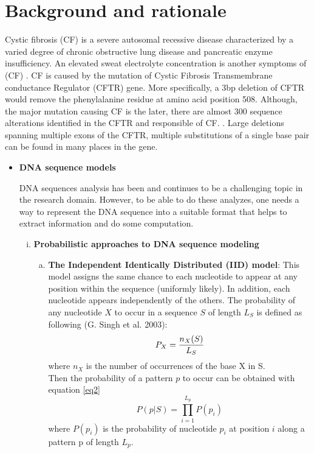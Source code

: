 \documentclass[10pt,twocolumn,letterpaper]{article}
\begin{document}
\section{Background and rationale}
 {
    \par Cystic fibrosis (CF) is a severe autosomal recessive disease characterized by a varied degree of chronic obstructive lung disease and pancreatic
    enzyme insufficiency. An elevated sweat electrolyte concentration is another symptoms of (CF) \cite{riordan1989identification}\cite{tsui1992spectrum}.
    CF is caused by the mutation of Cystic Fibrosis Transmembrane conductance Regulator (CFTR) gene. More specifically, a 3bp deletion of CFTR would remove 
    the phenylalanine residue at amino acid position 508. Although, the major mutation causing CF is the later, there are almost 300 sequence alterations 
    identified in the CFTR and responsible of CF. \cite{tsui1992spectrum}. Large deletions spanning multiple exons of the CFTR, multiple substitutions of 
    a single base pair can be found in many places in the gene.

    \begin{itemize}
   
   \item \textbf{DNA sequence models}
   \par{
       DNA sequences analysis has been and continues to be a challenging topic in the research domain. However, to be able to do these analyzes, one needs a way to represent the DNA sequence into a suitable format 
       that helps to extract information and do some computation.
       \begin{enumerate}[i.]
           \item \textbf{Probabilistic approaches to DNA sequence modeling}
           \begin{enumerate}[a.]
               \item \textbf{The Independent Identically Distributed (IID) model}: This model assigns the same chance to each nucleotide to appear at any position within the sequence (uniformly likely).
               In addition, each nucleotide appears independently of the others. The probability of any nucleotide \(X\) to occur in a sequence \(S\) of length \(L_S\) is defined as following (G. Singh et al. 2003):
               \begin{equation}
                   P_X = \frac{n_{X}(S)}{L_S}\\
                   \label{eq1}
               \end{equation}
               where \(n_X\) is the number of occurrences of the base X in S.\\
               Then the probability of a pattern \(p\) to occur can be obtained with equation \ref{eq2}
               \begin{equation}
                    P(p | S) = \prod_{i=1}^{L_p} P(p_i)
                   \label{eq2}
               \end{equation}
               where \(P(p_i)\) is the probability of nucleotide \(p_i\) at position \(i\) along a pattern p of length \(L_p\).\\
               

\end{enumerate}
\end{enumerate}}
\end{itemize}}
\end{document}
